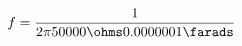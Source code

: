 \documentclass[preview]{standalone}
\begin{document}
\begin{align*}
f = \frac{1}{2\pi50000\ohms0.0000001\farads}
\end{align*}
\end{document}
